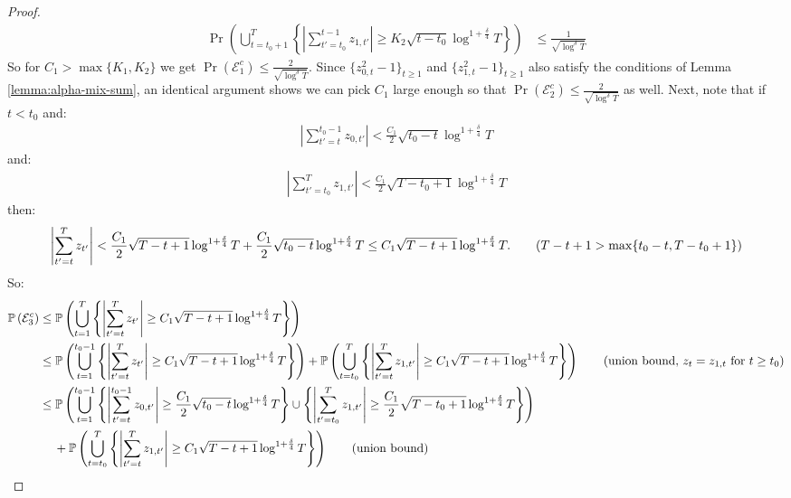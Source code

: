 \begin{proof}
\begin{align*}
    \Pr\left(\bigcup_{t = t_0+1}^T \left\{\left|\sum_{t'=t_0}^{t-1} z_{1,t'}\right| \geq K_2\sqrt{t-t_0}\log^{1+\frac{\delta}{4}} T\right\} \right) &\leq \frac{1}{\sqrt{\log^\delta T}}
\end{align*}
So for $C_1 > \max\{K_1,K_2\}$ we get $\Pr\left(\mathcal{E}_1^c\right) \leq \frac{2}{\sqrt{\log^\delta T}}$. Since $\{z^2_{0,t}-1\}_{t\geq1}$ and $\{z^2_{1,t}-1\}_{t\geq1}$ also satisfy the conditions of Lemma \ref{lemma:alpha-mix-sum}, an identical argument shows we can pick $C_1$ large enough so that $\Pr\left(\mathcal{E}_2^c\right) \leq \frac{2}{\sqrt{\log^\delta T}}$ as well. Next, note that if $t < t_0$ and: 
\begin{align*}
    \left|\sum_{t'=t}^{t_0-1} z_{0,t'}\right| < \frac{C_1}{2}\sqrt{t_0-t}\log^{1+\frac{\delta}{4}} T
\end{align*}
and:
\begin{align*}
    \left|\sum_{t'=t_0}^{T} z_{1,t'}\right| < \frac{C_1}{2}\sqrt{T-t_0+1}\log^{1+\frac{\delta}{4}} T
\end{align*}
then:
\begin{align*}
    \left|\sum_{t'=t}^{T} z_{t'}\right| < \frac{C_1}{2}\sqrt{T-t+1}\log^{1+\frac{\delta}{4}} T + \frac{C_1}{2}\sqrt{t_0-t}\log^{1+\frac{\delta}{4}} T \leq C_1\sqrt{T-t+1}\log^{1+\frac{\delta}{4}} T. \tag{$T-t+1 > \max\{t_0-t,T-t_0+1\}$}
\end{align*}
So:
\small
\begin{align*}
     \Pr\left(\mathcal{E}^c_3\right) &\leq \Pr\left(\bigcup_{t=1}^{T} \left\{\left|\sum_{t'=t}^{T} z_{t'}\right| \geq C_1\sqrt{T-t+1}\log^{1+\frac{\delta}{4}} T\right\} \right) \\
     &\leq\Pr\left(\bigcup_{t=1}^{t_0-1} \left\{\left|\sum_{t'=t}^{T} z_{t'}\right| \geq C_1\sqrt{T-t+1}\log^{1+\frac{\delta}{4}} T\right\} \right) + \Pr\left(\bigcup_{t=t_0}^{T} \left\{\left|\sum_{t'=t}^{T} z_{1,t'}\right| \geq C_1\sqrt{T-t+1}\log^{1+\frac{\delta}{4}} T\right\} \right) \tag{union bound, $z_t = z_{1,t}$ for $t\geq t_0$} \\
     &\leq\Pr\left(\bigcup_{t=1}^{t_0-1} \left\{\left|\sum_{t'=t}^{t_0-1} z_{0,t'}\right| \geq \frac{C_1}{2}\sqrt{t_0-t}\log^{1+\frac{\delta}{4}} T\right\}\cup\left\{ \left|\sum_{t'=t_0}^{T} z_{1,t'}\right| \geq \frac{C_1}{2}\sqrt{T-t_0+1}\log^{1+\frac{\delta}{4}} T\right\}  \right) \\
     &\quad\: + \Pr\left(\bigcup_{t=t_0}^{T} \left\{\left|\sum_{t'=t}^{T} z_{1,t'}\right| \geq C_1\sqrt{T-t+1}\log^{1+\frac{\delta}{4}} T\right\} \right) \tag{union bound} \\

\end{align*}
\end{proof}
